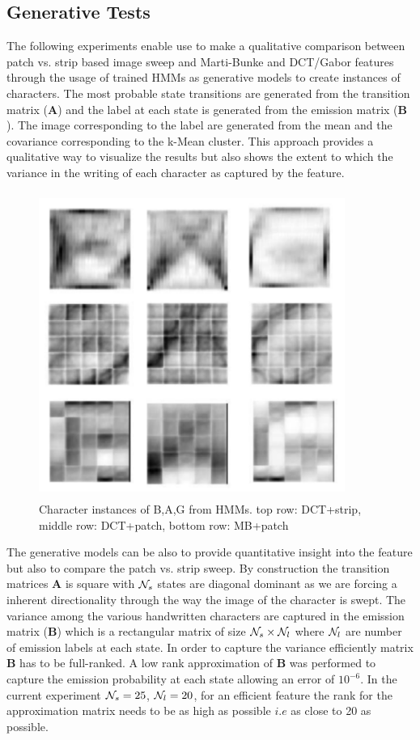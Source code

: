 \documentclass[runningheads]{llncs}
\def\N{{\cal N}}
\def\A{{\mathbf A}}
\def\B{{\mathbf B}}
\begin{document}
\subsection{Generative Tests}
The following experiments enable use to make a qualitative comparison between patch vs. strip based image sweep and Marti-Bunke and DCT/Gabor features through the usage of trained HMMs as generative models to create instances of characters. The most probable state transitions are generated from the transition matrix ($\A$) and the label at each state is generated from the emission matrix ($\B$). The image corresponding to the label are generated from the mean and the covariance corresponding to the k-Mean cluster. This approach provides a qualitative way to visualize the results but also shows the extent to which the variance in the writing of each character as captured by the feature.\\

\begin{figure}[!h]
\begin{minipage}[b]{1.0\linewidth}
  \centering
  \centerline{\includegraphics[width=10.0cm,height=10.0cm]{char}}
\end{minipage}
\caption{Character instances of B,A,G from HMMs. top row: DCT+strip, middle row: DCT+patch, bottom row: MB+patch}
\label{fig:chars}
\end{figure}

The generative models can be also to provide quantitative insight into the feature but also to compare the patch vs. strip sweep. By construction the transition matrices $\A$ is square with $\N_s$ states are diagonal dominant as we are forcing a inherent directionality through the way the image of the character is swept. The variance among the various handwritten characters are captured in the emission matrix ($\B$) which is a rectangular matrix of size $\N_s \times \N_l$ where $\N_l$ are number of emission labels at each state. In order to capture the variance efficiently matrix $\B$ has to be full-ranked. A low rank approximation of $\B$ was  performed to capture the emission probability at each state allowing an error of $10^{-6}$. In the current experiment $\N_s= 25$, $\N_l=20$, for an efficient feature the rank for the approximation matrix needs to be as high as possible $i.e$ as close to 20 as possible.
\end{document}
